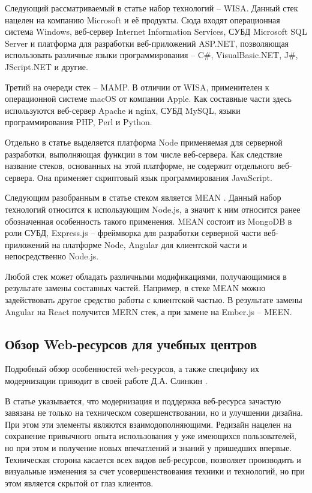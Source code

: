
Следующий рассматриваемый в статье набор технологий -- WISA.
Данный стек нацелен на компанию Microsoft и её продукты.
Сюда входят операционная система Windows, веб-сервер Internet Information Services, СУБД Microsoft SQL Server и платформа для разработки веб-приложений ASP.NET, позволяющая использовать различные языки программирования -- C\#, VisualBasic.NET, J\#, JScript.NET и другие.


Третий на очереди стек -- MAMP.
В отличии от WISA, применителен к операционной системе macOS от компании Apple.
Как составные части здесь используются веб-сервер Apache и nginх, СУБД MySQL, языки программирования PHP, Perl и Python.

Отдельно в статье выделяется платформа Node \cite{davidovsky-vibor-NODE} применяемая для серверной разработки, выполняющая функции в том числе веб-сервера.
Как следствие название стеков, основанных на этой платформе, не содержит отдельного веб-сервера.
Она применяет скриптовый язык программирования JavaScript.


Следующим разобранным в статье стеком является MEAN \cite{davidovsky-vibor-mean}.
Данный набор технологий относится к использующим Node.js, а значит к ним относится ранее обозначенная особенность такого применения.
MEAN состоит из MongoDB в роли СУБД, Express.js -- фреймворка для разработки серверной части веб-приложений на платформе Node, Angular для клиентской части и непосредственно Node.js.

Любой стек может обладать различными модификациями, получающимися в результате замены составных частей.
Например, в стеке MEAN можно задействовать другое средство работы с клиентской частью.
В результате замены Angular на React получится MERN стек, а при замене на Ember.js -- MEEN.


\subsection{Обзор Web-ресурсов для учебных центров}

Подробный обзор особенностей web-ресурсов, а также специфику их модернизации приводит в своей работе Д.А. Слинкин \cite{slinkin-sovremennie}.

В статье указывается, что модернизация и поддержка веб-ресурса зачастую завязана не только на техническом совершенствовании, но и улучшении дизайна.
При этом эти элементы являются взаимодополняющими.
Редизайн нацелен на сохранение привычного опыта использования у уже имеющихся пользователей, но при этом и получение новых впечатлений и знаний у пришедших впервые.
Техническая сторона касается всех видов веб-ресурсов, позволяет производить и визуальные изменения за счет усовершенствования техники и технологий, но при этом является скрытой от глаз клиентов.

